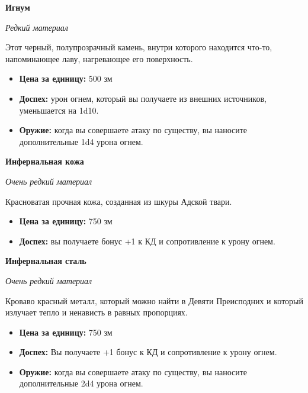 \documentclass[a4paper, 9pt, twocolumn]{book}
\begin{document}
	\noindent \textbf{Игнум}
	
	\noindent \textit{Редкий материал}
	
	\smallskip
	
	\noindent Этот черный, полупрозрачный камень, внутри которого находится что-то, напоминающее лаву, нагревающее его поверхность.
	
	\begin{itemize}
		\item \textbf{Цена за единицу:} 500 зм
		
		\item \textbf{Доспех:} урон огнем, который вы получаете из внешних источников, уменьшается на 1d10.
		
		\item \textbf{Оружие:} когда вы совершаете атаку по существу, вы наносите дополнительные 1d4 урона огнем.
	\end{itemize}

	\noindent \textbf{Инфернальная кожа}
	
	\noindent \textit{Очень редкий материал}
	
	\smallskip
	
	\noindent Красноватая прочная кожа, созданная из шкуры Адской твари.
	
	\begin{itemize}
		\item \textbf{Цена за единицу:} 750 зм
		
		\item \textbf{Доспех:} вы получаете бонус +1 к КД и сопротивление к урону огнем.
	\end{itemize}

	\noindent \textbf{Инфернальная сталь}
	
	\noindent \textit{Очень редкий материал}
	
	\smallskip
	
	\noindent Кроваво красный металл, который можно найти в Девяти Преисподних и который излучает тепло и ненависть в равных пропорциях.
	
	\begin{itemize}
		\item \textbf{Цена за единицу:} 750 зм
		
		\item \textbf{Доспех:} Вы получаете +1 бонус к КД и сопротивление к урону огнем.
		
		\item \textbf{Оружие:} когда вы совершаете атаку по существу, вы наносите дополнительные 2d4 урона огнем.
	\end{itemize}
\end{document}
